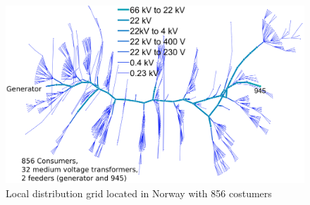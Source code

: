 \documentclass[aspectratio=169]{beamer}
\begin{document}
\begin{frame}
\begin{figure}[!htbp]
\centering
\includegraphics[width=4 in , height=2.5 in]{Figures/DistributionGridmodified.png}
\caption{\vspace*{-0.4cm} Local distribution grid located in Norway with 856 costumers}
\label{Norwegian1}
\end{figure}
\end{frame}
\end{document}
